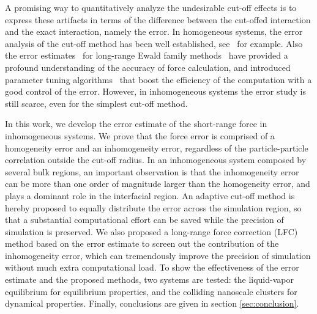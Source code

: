 \documentclass[aps,pre,preprint]{revtex4-1}
\begin{document}
A promising way to quantitatively analyze the undesirable cut-off
effects is to express these artifacts in terms of the difference
between the cut-offed interaction and the exact interaction, namely
the error. In homogeneous systems, the error analysis of the cut-off
method has been well established, see~\cite{kolafa1992cutoff} for
example. Also the error estimates~\cite{hummer1995numerical,
  kolafa1992cutoff, petersen1995accuracy, deserno1998mue2,
  wang2010optimizing} for long-range Ewald family
methods~\cite{ewald1921die, hockney1988computer, deserno1998mue1,
  darden1993pme, essmann1995spm} have provided a profound
understanding of the accuracy of force calculation, and introduced
parameter tuning algorithms~\cite{limbach06a, wang2010optimizing} that
boost the efficiency of the computation with a good control of the
error. However, in inhomogeneous systems the error study is still
scarce, even for the simplest cut-off method.

In this work, we develop the error estimate of the short-range force
in inhomogeneous systems. We prove that the 
force error is comprised of a homogeneity error and an inhomogeneity
error, regardless of the particle-particle correlation outside the
cut-off radius.  In an inhomogeneous system composed by several bulk
regions, an important observation is that the inhomogeneity error can
be more than one order of magnitude larger than the homogeneity
error, and plays a dominant role in the interfacial region. An
adaptive cut-off method is hereby proposed to equally distribute the
error across the simulation region, so that a substantial
computational effort can be saved while the precision of simulation is
preserved. We also proposed a long-range force correction (LFC) method
based on the error estimate to screen out the contribution of the
inhomogeneity error, which can tremendously improve the precision of
simulation without much extra computational load. To show the
effectiveness of the error estimate and the proposed methods, two
systems are tested: the liquid-vapor equilibrium for equilibrium
properties, and the colliding nanoscale clusters for dynamical
properties. Finally, conclusions are given in section
\ref{sec:conclusion}.

\end{document}
